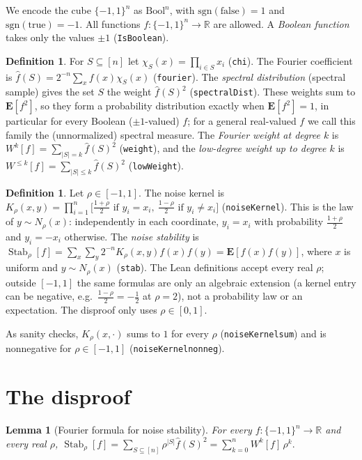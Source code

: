 \documentclass[11pt]{article}
\newtheorem{lemma}[theorem]{Lemma}
\theoremstyle{definition}
\newtheorem{definition}[theorem]{Definition}
\theoremstyle{remark}
\renewcommand{\_}{\oldus\allowbreak}
\newcommand{\Stab}{\operatorname{Stab}}
\begin{document}
We encode the cube $\{-1,1\}^n$ as $\mathrm{Bool}^n$, with $\mathrm{sgn}(\mathrm{false})=1$ and
$\mathrm{sgn}(\mathrm{true})=-1$. All functions $f\colon\{-1,1\}^n\to\mathbb{R}$ are allowed. A
\emph{Boolean function} takes only the values $\pm1$ (\texttt{IsBoolean}).

\begin{definition}
For $S\subseteq[n]$ let $\chi_S(x)=\prod_{i\in S}x_i$ (\texttt{chi}). The Fourier coefficient is
$\hat f(S)=2^{-n}\sum_x f(x)\chi_S(x)$ (\texttt{fourier}). The \emph{spectral distribution}
(spectral sample) gives the set $S$ the weight $\hat f(S)^2$ (\texttt{spectralDist}). These
weights sum to $\mathbf E[f^2]$, so they form a probability distribution exactly when
$\mathbf E[f^2]=1$, in particular for every Boolean ($\pm1$-valued) $f$; for a general real-valued
$f$ we call this family the (unnormalized) spectral measure. The
\emph{Fourier weight at degree $k$} is $W^k[f]=\sum_{|S|=k}\hat f(S)^2$ (\texttt{weight}), and the
\emph{low-degree weight up to degree $k$} is $W^{\le k}[f]=\sum_{|S|\le k}\hat f(S)^2$
(\texttt{lowWeight}).
\end{definition}

\begin{definition}
Let $\rho\in[-1,1]$. The noise kernel is
$K_\rho(x,y)=\prod_{i=1}^n\bigl[\tfrac{1+\rho}{2}\text{ if }y_i=x_i,\ \tfrac{1-\rho}{2}\text{ if }
y_i\ne x_i\bigr]$ (\texttt{noiseKernel}). This is the law of $y\sim N_\rho(x)$: independently in
each coordinate, $y_i=x_i$ with probability $\frac{1+\rho}{2}$ and $y_i=-x_i$ otherwise. The
\emph{noise stability} is
$\Stab_\rho[f]=\sum_x\sum_y 2^{-n}K_\rho(x,y)f(x)f(y)=\mathbf{E}[f(x)f(y)]$, where $x$ is uniform
and $y\sim N_\rho(x)$ (\texttt{stab}).
The Lean definitions accept every real $\rho$; outside $[-1,1]$ the same formulas are only an
algebraic extension (a kernel entry can be negative, e.g.\ $\frac{1-\rho}{2}=-\frac12$ at $\rho=2$),
not a probability law or an expectation. The disproof only uses $\rho\in[0,1]$.
\end{definition}

As sanity checks, $K_\rho(x,\cdot)$ sums to $1$ for every $\rho$ (\texttt{noiseKernel\_sum}) and is
nonnegative for $\rho\in[-1,1]$ (\texttt{noiseKernel\_nonneg}).

\section{The disproof}

\begin{lemma}[Fourier formula for noise stability]\label{lem:fourier}
For every $f\colon\{-1,1\}^n\to\mathbb{R}$ and every real $\rho$,
$\Stab_\rho[f]=\sum_{S\subseteq[n]}\rho^{|S|}\hat f(S)^2=\sum_{k=0}^{n}W^k[f]\,\rho^k.$
\end{lemma}
\end{document}
